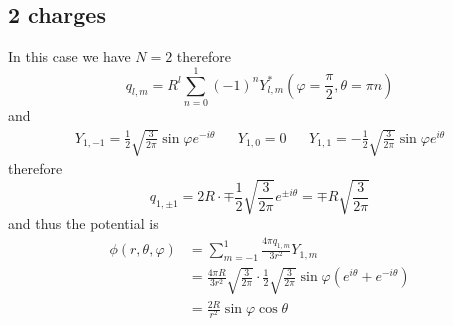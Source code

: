\subsection{2 charges}
In this case we have \(N=2\) therefore
\begin{equation}
  q_{l,m}=R^l\sum\limits_{n=0}^{1}{(-1)}^n Y^*_{l,m}(\varphi=\frac{\pi}{2},\theta=\pi n)
\end{equation}
and
\begin{align}
	Y_{1,-1}=\frac{1}{2}\sqrt{\frac{3}{2\pi}} \sin\varphi e^{-i\theta} && Y_{1,0}=0 && Y_{1,1}=-\frac{1}{2}\sqrt{\frac{3}{2\pi}} \sin\varphi e^{i\theta}
\end{align}
therefore
\begin{equation}
  q_{1,\pm1}=2R\cdot\mp\frac{1}{2}\sqrt{\frac{3}{2\pi}}e^{\pm i\theta}=\mp R\sqrt{\frac{3}{2\pi}}
\end{equation}
and thus the potential is
\begin{align}
	\phi(r,\theta,\varphi) &= \sum\limits_{m=-1}^1\frac{4\pi q_{1,m}}{3r^2}Y_{1,m}\\
	&= \frac{4\pi R}{3r^2}\sqrt{\frac{3}{2\pi}}\cdot\frac{1}{2}\sqrt{\frac{3}{2\pi}}\sin\varphi\left(e^{i\theta}+e^{-i\theta}\right)\\
	&= \frac{2R}{r^2}\sin\varphi\cos\theta
\end{align}
